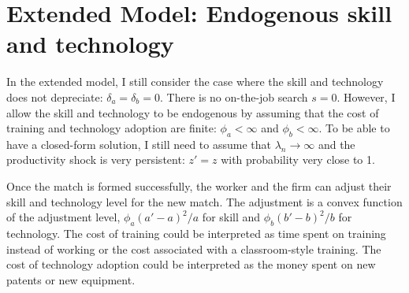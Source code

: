 \documentclass[12pt]{article}
\newcommand{\1}{\mathbb{1}}
\begin{document}
\section{Extended Model: Endogenous skill and technology}
In the extended model, I still consider the case where the skill and technology does not depreciate: $\delta_a = \delta_b = 0$. There is no on-the-job search $s=0$. However, I allow the skill and technology to be endogenous by assuming that the cost of training and technology adoption are finite: $\phi_a<\infty$ and $\phi_b<\infty$. To be able to have a closed-form solution, I still need to assume that $\lambda_n \to \infty$ and the productivity shock is very persistent: $z' = z$ with probability very close to 1. 

Once the match is formed successfully, the worker and the firm can adjust their skill and technology level for the new match. The adjustment is a convex function of the adjustment level, $\phi_a(a'-a)^2/a$ for skill and $\phi_b(b'-b)^2/b$ for technology. The cost of training could be interpreted as time spent on training instead of working or the cost associated with a classroom-style training. The cost of technology adoption could be interpreted as the money spent on new patents or new equipment. 
\end{document}

